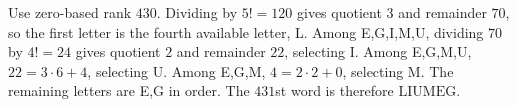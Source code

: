 Use zero-based rank $430$. Dividing by $5!=120$ gives quotient $3$ and remainder $70$, so the first letter is the fourth available letter, L. Among E,G,I,M,U, dividing $70$ by $4!=24$ gives quotient $2$ and remainder $22$, selecting I. Among E,G,M,U, $22=3\cdot 6+4$, selecting U. Among E,G,M, $4=2\cdot 2+0$, selecting M. The remaining letters are E,G in order. The $431$st word is therefore $\boxed{\text{LIUMEG}}$.
